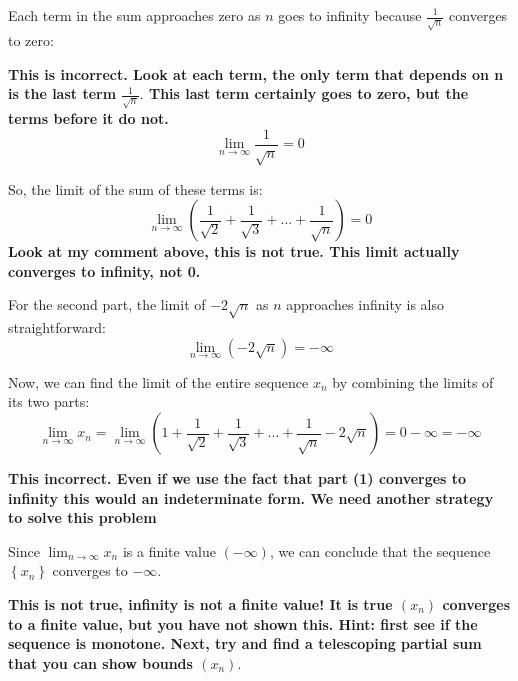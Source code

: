 \documentclass{report}
\begin{document}
Each term in the sum approaches zero as $n$ goes to infinity because $\frac{1}{\sqrt{n}}$ converges to zero:

\textbf{This is incorrect. Look at each term, the only term that depends on n is the last term $\frac{1}{\sqrt{n}}.$ This last term certainly goes to zero, but the terms before it do not. }
$$
\lim _{n \rightarrow \infty} \frac{1}{\sqrt{n}}=0
$$

So, the limit of the sum of these terms is:
$$
\lim _{n \rightarrow \infty}\left(\frac{1}{\sqrt{2}}+\frac{1}{\sqrt{3}}+\ldots+\frac{1}{\sqrt{n}}\right)=0
$$
\textbf{Look at my comment above, this is not true. This limit actually converges to infinity, not 0.}

For the second part, the limit of $-2 \sqrt{n}$ as $n$ approaches infinity is also straightforward:
$$
\lim _{n \rightarrow \infty}(-2 \sqrt{n})=-\infty
$$

Now, we can find the limit of the entire sequence $x_n$ by combining the limits of its two parts:
$$
\lim _{n \rightarrow \infty} x_n=\lim _{n \rightarrow \infty}\left(1+\frac{1}{\sqrt{2}}+\frac{1}{\sqrt{3}}+\ldots+\frac{1}{\sqrt{n}}-2 \sqrt{n}\right)=0-\infty=-\infty
$$

\textbf{This incorrect. Even if we use the fact that part (1) converges to infinity this would an indeterminate form. We need another strategy to solve this problem}

Since $\lim _{n \rightarrow \infty} x_n$ is a finite value $(-\infty)$, we can conclude that the sequence $\left\{x_n\right\}$ converges to $-\infty$.

\textbf{This is not true, infinity is not a finite value! It is true  $(x_n)$ converges to a finite value, but you have not shown this. Hint: first see if the sequence is monotone. Next, try and find a telescoping partial sum that you can show bounds $(x_n).$ }
\end{document}
